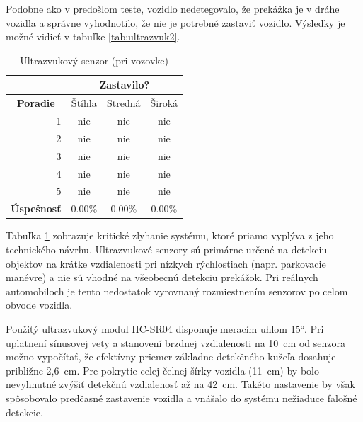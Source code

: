 Podobne ako v predošlom teste, vozidlo nedetegovalo, že prekážka je v dráhe vozidla a správne vyhodnotilo, že nie je potrebné zastaviť vozidlo. Výsledky je možné vidieť v tabuľke \ref{tab:ultrazvuk2}.\par
\begin{table}[!ht]
\caption{Ultrazvukový senzor (pri vozovke)}
\label{tab:ultrazvuk3}
\centering
\begin{tabular}{|l r|c|c|c|}
        \hline
        \multicolumn{2}{|c|}{} & \multicolumn{3}{c|}{\textbf{Zastavilo?}} \\ \hline
        \multicolumn{2}{|c|}{\textbf{Poradie}} & Štíhla & Stredná & Široká \\ \hline
        & 1 & nie & nie & nie \\ \hline
        & 2 & nie & nie & nie \\ \hline
        & 3 & nie & nie & nie \\ \hline
        & 4 & nie & nie & nie \\ \hline
        & 5 & nie & nie & nie \\ \hline
        \multicolumn{2}{|l|}{\textbf{Úspešnosť}} & 0.00\% & 0.00\% & 0.00\% \\ \hline
\end{tabular}
\end{table}
Tabuľka \ref{tab:ultrazvuk3} zobrazuje kritické zlyhanie systému, ktoré priamo vyplýva z jeho technického návrhu. Ultrazvukové senzory sú primárne určené na detekciu objektov na krátke vzdialenosti pri nízkych rýchlostiach (napr. parkovacie manévre) a nie sú vhodné na všeobecnú detekciu prekážok. Pri reálnych automobiloch je tento nedostatok vyrovnaný rozmiestnením senzorov po celom obvode vozidla.\par
Použitý ultrazvukový modul HC-SR04 disponuje meracím uhlom 15°. Pri uplatnení sínusovej vety a stanovení brzdnej vzdialenosti na 10~cm od senzora možno vypočítať, že efektívny priemer základne detekčného kužeľa dosahuje približne 2,6~cm. Pre pokrytie celej čelnej šírky vozidla (11~cm) by bolo nevyhnutné zvýšiť detekčnú vzdialenosť až na 42~cm. Takéto nastavenie by však spôsobovalo predčasné zastavenie vozidla a vnášalo do systému nežiaduce falošné detekcie.
